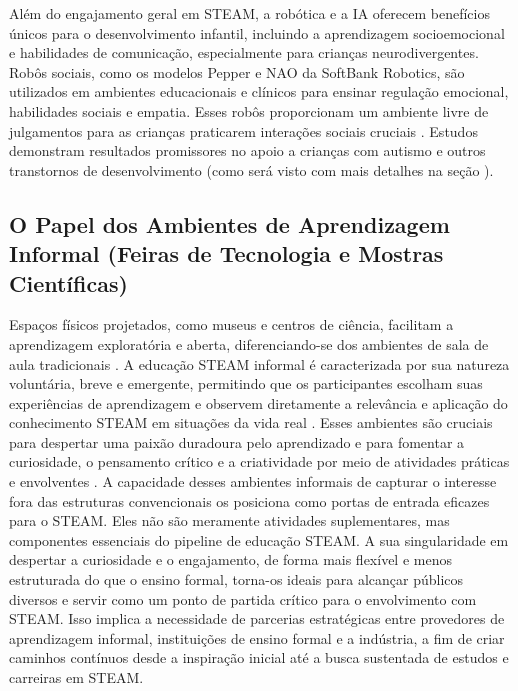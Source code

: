 \documentclass[%
  a4paper,%
  12pt,%
  fleqn,%
  english,%
  brazilian,%
]{article}
\begin{document}
Além do engajamento geral em STEAM, a robótica e a IA oferecem benefícios únicos para o desenvolvimento infantil, incluindo a aprendizagem socioemocional e habilidades de comunicação, especialmente para crianças neurodivergentes. Robôs sociais, como os modelos Pepper e NAO da SoftBank Robotics, são utilizados em ambientes educacionais e clínicos para ensinar regulação emocional, habilidades sociais e empatia. Esses robôs proporcionam um ambiente livre de julgamentos para as crianças praticarem interações sociais cruciais \cite{behavioralHealthRoboticsAI2025}. Estudos demonstram resultados promissores no apoio a crianças com autismo e outros transtornos de desenvolvimento (como será visto com mais detalhes na seção ). %

\subsection{O Papel dos Ambientes de Aprendizagem Informal (Feiras de Tecnologia e Mostras Científicas)}

Espaços físicos projetados, como museus e centros de ciência, facilitam a aprendizagem exploratória e aberta, diferenciando-se dos ambientes de sala de aula tradicionais \cite{ross2024BeyondExhibits}. A educação STEAM informal é caracterizada por sua natureza voluntária, breve e emergente, permitindo que os participantes escolham suas experiências de aprendizagem e observem diretamente a relevância e aplicação do conhecimento STEAM em situações da vida real \cite{cheung2024SummerLibraries}. Esses ambientes são cruciais para despertar uma paixão duradoura pelo aprendizado e para fomentar a curiosidade, o pensamento crítico e a criatividade por meio de atividades práticas e envolventes \cite{meegleYouthRobotics2025}.
A capacidade desses ambientes informais de capturar o interesse fora das estruturas convencionais os posiciona como portas de entrada eficazes para o STEAM. Eles não são meramente atividades suplementares, mas componentes essenciais do pipeline de educação STEAM. A sua singularidade em despertar a curiosidade e o engajamento, de forma mais flexível e menos estruturada do que o ensino formal, torna-os ideais para alcançar públicos diversos e servir como um ponto de partida crítico para o envolvimento com STEAM. Isso implica a necessidade de parcerias estratégicas entre provedores de aprendizagem informal, instituições de ensino formal e a indústria, a fim de criar caminhos contínuos desde a inspiração inicial até a busca sustentada de estudos e carreiras em STEAM.
\end{document}

